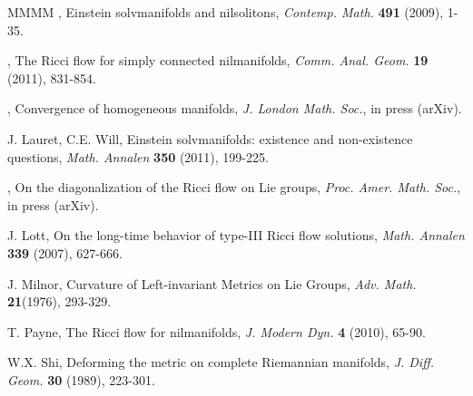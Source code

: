\documentclass[11pt]{amsart}
\theoremstyle{plain}
\theoremstyle{definition}
\theoremstyle{remark}
\begin{document}
\begin{thebibliography}{MMMM}
  \bysame, Einstein solvmanifolds and nilsolitons, {\it Contemp. Math.} {\bf 491} (2009), 1-35.

  \bysame, The Ricci flow for simply connected nilmanifolds, {\it Comm. Anal. Geom.} {\bf 19} (2011), 831-854.

  \bysame, Convergence of homogeneous manifolds, {\it J. London Math. Soc.}, in press (arXiv).

  {\sc J. Lauret, C.E. Will}, Einstein solvmanifolds: existence
and non-existence questions, {\it Math. Annalen} {\bf 350} (2011), 199-225.

  \bysame, On the diagonalization of the Ricci flow on Lie groups, {\it Proc. Amer. Math. Soc.}, in press (arXiv).

 {\sc J. Lott}, On the long-time behavior of type-III Ricci flow solutions, {\it Math.
Annalen} {\bf 339} (2007), 627-666.

 {\sc J. Milnor}, Curvature of Left-invariant Metrics on Lie
Groups, {\it Adv. Math.} {\bf 21}(1976), 293-329.

 {\sc T. Payne}, The Ricci flow for nilmanifolds, {\it J. Modern Dyn.} {\bf 4} (2010), 65-90.

 {\sc W.X. Shi}, Deforming the metric on complete Riemannian manifolds, {\it J. Diff. Geom.} {\bf 30} (1989), 223-301.

\end{thebibliography}
\end{document}
